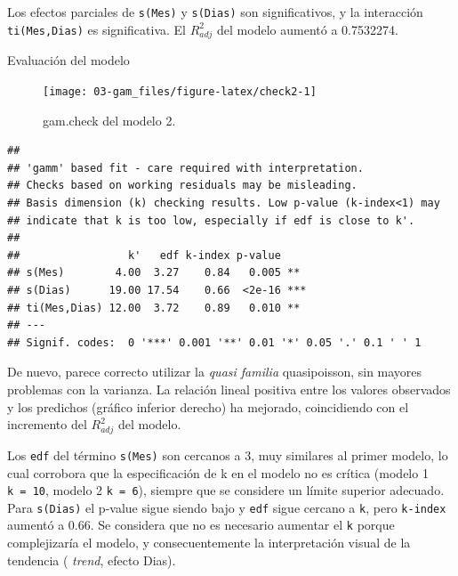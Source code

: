 \documentclass[
]{book}
\newenvironment{Shaded}{\begin{snugshade}}{\end{snugshade}}
\newcommand{\AttributeTok}[1]{\textcolor[rgb]{0.77,0.63,0.00}{#1}}
\newcommand{\DecValTok}[1]{\textcolor[rgb]{0.00,0.00,0.81}{#1}}
\newcommand{\FunctionTok}[1]{\textcolor[rgb]{0.00,0.00,0.00}{#1}}
\newcommand{\NormalTok}[1]{#1}
\newcommand{\SpecialCharTok}[1]{\textcolor[rgb]{0.00,0.00,0.00}{#1}}
\newcommand{\StringTok}[1]{\textcolor[rgb]{0.31,0.60,0.02}{#1}}
\begin{document}
Los efectos parciales de \texttt{s(Mes)} y \texttt{s(Dias)} son significativos, y la interacción \texttt{ti(Mes,Dias)} es significativa. El \(R_{adj}^{2}\) del modelo aumentó a 0.7532274.

Evaluación del modelo

\begin{Shaded}
\end{Shaded}

\begin{figure}

{\centering \texttt{[image: 03-gam\_files/figure-latex/check2-1]} 

}

\caption{gam.check del modelo 2.}\label{fig:check2}
\end{figure}

\begin{verbatim}
## 
## 'gamm' based fit - care required with interpretation.
## Checks based on working residuals may be misleading.
## Basis dimension (k) checking results. Low p-value (k-index<1) may
## indicate that k is too low, especially if edf is close to k'.
## 
##                 k'   edf k-index p-value    
## s(Mes)        4.00  3.27    0.84   0.005 ** 
## s(Dias)      19.00 17.54    0.66  <2e-16 ***
## ti(Mes,Dias) 12.00  3.72    0.89   0.010 ** 
## ---
## Signif. codes:  0 '***' 0.001 '**' 0.01 '*' 0.05 '.' 0.1 ' ' 1
\end{verbatim}

De nuevo, parece correcto utilizar la \emph{quasi familia} quasipoisson, sin mayores problemas con la varianza. La relación lineal positiva entre los valores observados y los predichos (gráfico inferior derecho) ha mejorado, coincidiendo con el incremento del \(R_{adj}^{2}\) del modelo.

Los \texttt{edf} del término \texttt{s(Mes)} son cercanos a 3, muy similares al primer modelo, lo cual corrobora que la especificación de k en el modelo no es crítica (modelo 1 \texttt{k\ =\ 10}, modelo 2 \texttt{k\ =\ 6}), siempre que se considere un límite superior adecuado. Para \texttt{s(Dias)} el p-value sigue siendo bajo y \texttt{edf} sigue cercano a \texttt{k\textquotesingle{}}, pero \texttt{k-index} aumentó a 0.66. Se considera que no es necesario aumentar el \texttt{k} porque complejizaría el modelo, y consecuentemente la interpretación visual de la tendencia ( \emph{trend}, efecto Dias).
\end{document}
